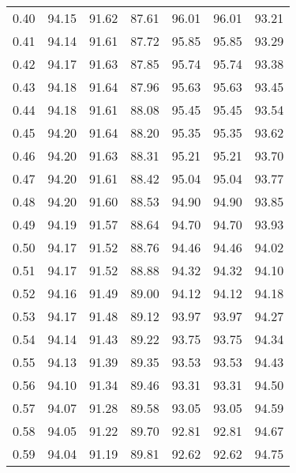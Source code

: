 \begin{tabular}{|c|c|c|c|c|c|c|}
      0.40 &     94.15 &     91.62 &      87.61 &   96.01 &      96.01 &         93.21 \\
      0.41 &     94.14 &     91.61 &      87.72 &   95.85 &      95.85 &         93.29 \\
      0.42 &     94.17 &     91.63 &      87.85 &   95.74 &      95.74 &         93.38 \\
      0.43 &     94.18 &     91.64 &      87.96 &   95.63 &      95.63 &         93.45 \\
      0.44 &     94.18 &     91.61 &      88.08 &   95.45 &      95.45 &         93.54 \\
      0.45 &     94.20 &     91.64 &      88.20 &   95.35 &      95.35 &         93.62 \\
      0.46 &     94.20 &     91.63 &      88.31 &   95.21 &      95.21 &         93.70 \\
      0.47 &     94.20 &     91.61 &      88.42 &   95.04 &      95.04 &         93.77 \\
      0.48 &     94.20 &     91.60 &      88.53 &   94.90 &      94.90 &         93.85 \\
      0.49 &     94.19 &     91.57 &      88.64 &   94.70 &      94.70 &         93.93 \\
      0.50 &     94.17 &     91.52 &      88.76 &   94.46 &      94.46 &         94.02 \\
      0.51 &     94.17 &     91.52 &      88.88 &   94.32 &      94.32 &         94.10 \\
      0.52 &     94.16 &     91.49 &      89.00 &   94.12 &      94.12 &         94.18 \\
      0.53 &     94.17 &     91.48 &      89.12 &   93.97 &      93.97 &         94.27 \\
      0.54 &     94.14 &     91.43 &      89.22 &   93.75 &      93.75 &         94.34 \\
      0.55 &     94.13 &     91.39 &      89.35 &   93.53 &      93.53 &         94.43 \\
      0.56 &     94.10 &     91.34 &      89.46 &   93.31 &      93.31 &         94.50 \\
      0.57 &     94.07 &     91.28 &      89.58 &   93.05 &      93.05 &         94.59 \\
      0.58 &     94.05 &     91.22 &      89.70 &   92.81 &      92.81 &         94.67 \\
      0.59 &     94.04 &     91.19 &      89.81 &   92.62 &      92.62 &         94.75 \\

\end{tabular}

